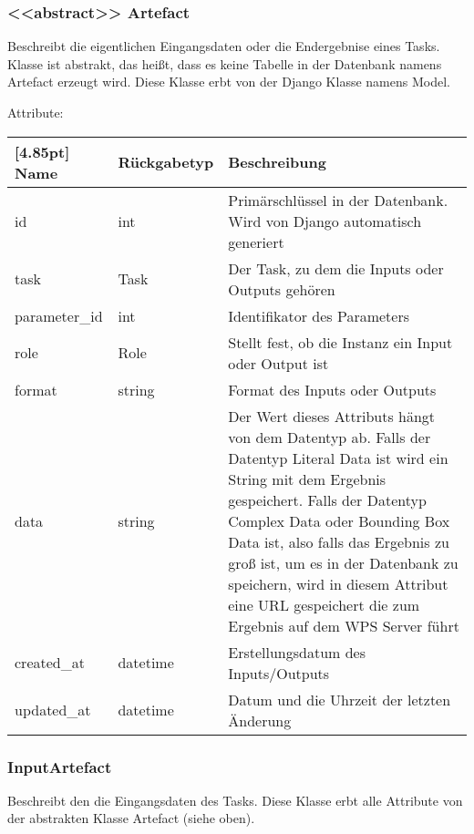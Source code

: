 \newpage

		\subsubsection{<<abstract>> Artefact}
			Beschreibt die eigentlichen Eingangsdaten oder die Endergebnise eines Tasks. Klasse ist abstrakt, das heißt, dass es keine Tabelle in der Datenbank namens \glqq Artefact \grqq erzeugt wird. \newline 
			Diese Klasse erbt von der Django Klasse namens \glqq Model\grqq .\newline
			
			Attribute:
			\begin{center}
				\setlength\tabcolsep{5pt}
				\renewcommand{\arraystretch}{1.5}
				
				\begin{tabularx}{\textwidth}{|l|l|X|}
					\hline
					\rowcolor[gray]{0.75}[4.85pt]
					Name & Rückgabetyp & Beschreibung \\ \hline 
					id & int & Primärschlüssel in der Datenbank. Wird von Django automatisch generiert \\ \hline
					task & Task & Der Task, zu dem die Inputs oder Outputs gehören\\ \hline
					parameter\_id & int & Identifikator des Parameters \\ \hline
					role & Role & Stellt fest, ob die Instanz ein Input oder Output ist \\ \hline
					format & string & Format des Inputs oder Outputs \\ \hline
					data & string & Der Wert dieses Attributs hängt von dem Datentyp ab. Falls der Datentyp Literal Data ist wird ein String mit dem Ergebnis gespeichert. Falls der Datentyp Complex Data oder Bounding Box Data ist, also falls das Ergebnis zu groß ist, um es in der Datenbank zu speichern, wird in diesem Attribut eine URL gespeichert die zum Ergebnis auf dem WPS Server führt \\ \hline
					created\_at & datetime & Erstellungsdatum des Inputs/Outputs \\ \hline
					updated\_at & datetime & Datum und die Uhrzeit der letzten Änderung \\ \hline
				\end{tabularx}
			\end{center}
		\subsubsection{InputArtefact}
			Beschreibt den die Eingangsdaten des Tasks. \newline
			Diese Klasse erbt alle Attribute von der abstrakten Klasse Artefact (siehe oben).
			
